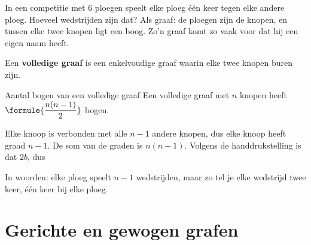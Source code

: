 In een competitie met 6 ploegen speelt elke ploeg één keer tegen elke andere ploeg. Hoeveel wedstrijden zijn dat? Als graaf: de ploegen zijn de knopen, en tussen elke twee knopen ligt een boog. Zo'n graaf komt zo vaak voor dat hij een eigen naam heeft.

\begin{theorie}
Een \textbf{\textcolor{accent}{volledige graaf}} is een enkelvoudige graaf waarin elke twee knopen buren zijn.

\begin{stelling}{Aantal bogen van een volledige graaf}
Een volledige graaf met $n$ knopen heeft $\formule{\dfrac{n(n-1)}{2}}$ bogen.
\end{stelling}
\begin{bewijs}
Elke knoop is verbonden met alle $n - 1$ andere knopen, dus elke knoop heeft graad $n - 1$. De som van de graden is $n(n - 1)$. Volgens de handdrukstelling is dat $2b$, dus
\end{bewijs}
\end{theorie}

In woorden: elke ploeg speelt $n - 1$ wedstrijden, maar zo tel je elke wedstrijd twee keer, één keer bij elke ploeg.


\begin{oefeningen}
\end{oefeningen}

\section{Gerichte en gewogen grafen}

